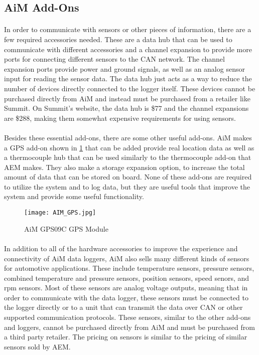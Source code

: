 \subsection{AiM Add-Ons}

\paragraph{}
In order to communicate with sensors or other pieces of information, there are a few required accessories needed.
These are a data hub that can be used to communicate with different accessories and a channel expansion to provide more ports for connecting different sensors to the CAN network.
The channel expansion ports provide power and ground signals, as well as an analog sensor input for reading the sensor data.
The data hub just acts as a way to reduce the number of devices directly connected to the logger itself.
These devices cannot be purchased directly from AiM and instead must be purchased from a retailer like Summit.
On Summit's website, the data hub is \$77 and the channel expansions are \$288, making them somewhat expensive requirements for using sensors.

\paragraph{}
Besides these essential add-ons, there are some other useful add-ons.
AiM makes a GPS add-on shown in \cref{fig:AIM_GPS} that can be added provide real location data as well as a thermocouple hub that can be used similarly to the thermocouple add-on that AEM makes.
They also make a storage expansion option, to increase the total amount of data that can be stored on board.
None of these add-ons are required to utilize the system and to log data, but they are useful tools that improve the system and provide some useful functionality.

\begin{figure}[H]
	\centering
	\texttt{[image: AIM\_GPS.jpg]}
	\caption{AiM GPS09C GPS Module}
	\label{fig:AIM_GPS}
\end{figure}

\paragraph{}
In addition to all of the hardware accessories to improve the experience and connectivity of AiM data loggers, AiM also sells many different kinds of sensors for automotive applications.
These include temperature sensors, pressure sensors, combined temperature and pressure sensors, position sensors, speed senors, and rpm sensors.
Most of these sensors are analog voltage outputs, meaning that in order to communicate with the data logger, these sensors must be connected to the logger directly or to a unit that can transmit the data over CAN or other supported communication protocols.
These sensors, similar to the other add-ons and loggers, cannot be purchased directly from AiM and must be purchased from a third party retailer.
The pricing on sensors is similar to the pricing of similar sensors sold by AEM.

